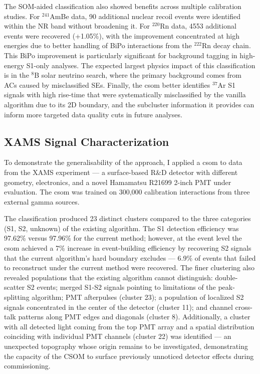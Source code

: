 The SOM-aided classification also showed benefits across multiple calibration studies. For $^{241}$AmBe data, 90 additional nuclear recoil events were identified within the NR band without broadening it. For $^{220}$Rn data, 4553 additional events were recovered (+1.05\%), with the improvement concentrated at high energies due to better handling of BiPo interactions from the $^{222}$Rn decay chain. This BiPo improvement is particularly significant for background tagging in high-energy S1-only analyses. The expected largest physics impact of this classification is in the $^8$B solar neutrino search, where the primary background comes from ACs caused by misclassified SEs. Finally, the \acrshort{csom} better identifies $^{37}$Ar S1 signals with high rise-time that were systematically misclassified by the vanilla algorithm due to its 2D boundary, and the subcluster information it provides can inform more targeted data quality cuts in future analyses.

\subsection*{XAMS Signal Characterization}

To demonstrate the generalisability of the approach, I applied a \acrshort{csom} to data from the XAMS experiment — a surface-based R\&D detector with different geometry, electronics, and a novel Hamamatsu R21699 2-inch PMT under evaluation. The \acrshort{csom} was trained on 300,000 calibration interactions from three external gamma sources.

The classification produced 23 distinct clusters compared to the three categories (S1, S2, unknown) of the existing algorithm. The S1 detection efficiency was 97.62\% versus 97.96\% for the current method; however, at the event level the \acrshort{csom} achieved a 7\% increase in event-building efficiency by recovering S2 signals that the current algorithm's hard boundary excludes — 6.9\% of events that failed to reconstruct under the current method were recovered. The finer clustering also revealed populations that the existing algorithm cannot distinguish: double-scatter S2 events; merged S1-S2 signals pointing to limitations of the peak-splitting algorithm; PMT afterpulses (cluster 23); a population of localized S2 signals concentrated in the center of the detector (cluster 11); and channel cross-talk patterns along PMT edges and diagonals (cluster 8). Additionally, a cluster with all detected light coming from the top PMT array and a spatial distribution coinciding with individual PMT channels (cluster 22) was identified — an unexpected topography whose origin remains to be investigated, demonstrating the capacity of the CSOM to surface previously unnoticed detector effects during commissioning.

